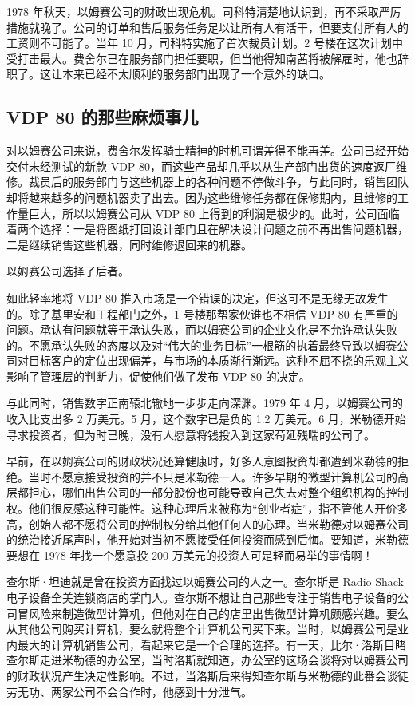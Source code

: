 \documentclass[12pt,UTF8]{ctexbook}
\begin{document}
1978 年秋天，以姆赛公司的财政出现危机。司科特清楚地认识到，再不采取严厉措施就晚了。公司的订单和售后服务任务足以让所有人有活干，但要支付所有人的工资则不可能了。当年 10 月，司科特实施了首次裁员计划。2 号楼在这次计划中受打击最大。费舍尔已在服务部门担任要职，但当他得知南茜将被解雇时，他也辞职了。这让本来已经不太顺利的服务部门出现了一个意外的缺口。





\subsection{VDP 80 的那些麻烦事儿}


对以姆赛公司来说，费舍尔发挥骑士精神的时机可谓差得不能再差。公司已经开始交付未经测试的新款 VDP 80，而这些产品却几乎以从生产部门出货的速度返厂维修。裁员后的服务部门与这些机器上的各种问题不停做斗争，与此同时，销售团队却将越来越多的问题机器卖了出去。因为这些维修任务都在保修期内，且维修的工作量巨大，所以以姆赛公司从 VDP 80 上得到的利润是极少的。此时，公司面临着两个选择：一是将图纸打回设计部门且在解决设计问题之前不再出售问题机器，二是继续销售这些机器，同时维修退回来的机器。

以姆赛公司选择了后者。

如此轻率地将 VDP 80 推入市场是一个错误的决定，但这可不是无缘无故发生的。除了基里安和工程部门之外，1 号楼那帮家伙谁也不相信 VDP 80 有严重的问题。承认有问题就等于承认失败，而以姆赛公司的企业文化是不允许承认失败的。不愿承认失败的态度以及对“伟大的业务目标”一根筋的执着最终导致以姆赛公司对目标客户的定位出现偏差，与市场的本质渐行渐远。这种不屈不挠的乐观主义影响了管理层的判断力，促使他们做了发布 VDP 80 的决定。

与此同时，销售数字正南辕北辙地一步步走向深渊。1979 年 4 月，以姆赛公司的收入比支出多 2 万美元。5 月，这个数字已是负的 1.2 万美元。6 月，米勒德开始寻求投资者，但为时已晚，没有人愿意将钱投入到这家苟延残喘的公司了。

早前，在以姆赛公司的财政状况还算健康时，好多人意图投资却都遭到米勒德的拒绝。当时不愿意接受投资的并不只是米勒德一人。许多早期的微型计算机公司的高层都担心，哪怕出售公司的一部分股份也可能导致自己失去对整个组织机构的控制权。他们很反感这种可能性。这种心理后来被称为“创业者症”，指不管他人开价多高，创始人都不愿将公司的控制权分给其他任何人的心理。当米勒德对以姆赛公司的统治接近尾声时，他开始对当初不愿接受任何投资而感到后悔。要知道，米勒德要想在 1978 年找一个愿意投 200 万美元的投资人可是轻而易举的事情啊！

查尔斯·坦迪就是曾在投资方面找过以姆赛公司的人之一。查尔斯是 Radio Shack 电子设备全美连锁商店的掌门人。查尔斯不想让自己那些专注于销售电子设备的公司冒风险来制造微型计算机，但他对在自己的店里出售微型计算机颇感兴趣。要么从其他公司购买计算机，要么就将整个计算机公司买下来。当时，以姆赛公司是业内最大的计算机销售公司，看起来它是一个合理的选择。有一天，比尔·洛斯目睹查尔斯走进米勒德的办公室，当时洛斯就知道，办公室的这场会谈将对以姆赛公司的财政状况产生决定性影响。不过，当洛斯后来得知查尔斯与米勒德的此番会谈徒劳无功、两家公司不会合作时，他感到十分泄气。
\end{document}
